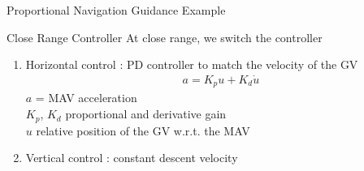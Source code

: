 
\begin{frame}{Proportional Navigation Guidance Example}

\begin{center}
\end{center}

\end{frame}




\begin{frame}{Close Range Controller}
	At close range, we switch the controller
	\begin{enumerate}
		\item Horizontal control : PD controller to match the velocity of the GV
	\begin{align*}
		a = K_p u + K_d \dot{u}
	\end{align*}
	$a$ = MAV acceleration \\
	$K_p$, $K_d$ proportional and derivative gain \\
	$u$ relative position of the GV w.r.t. the MAV
		\item Vertical control : constant descent velocity
	\end{enumerate} 
\end{frame}

